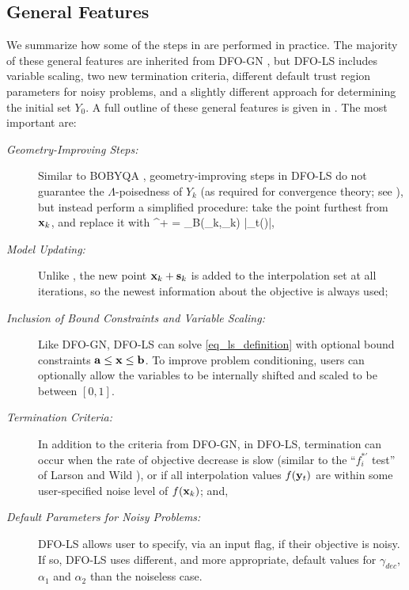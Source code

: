 \subsection{General Features} \label{sec_implementation_general}
We summarize how some of the steps in  are performed in practice. 
The majority of these general features are inherited from DFO-GN \cite{Cartis2017a}, but DFO-LS includes variable scaling, two new termination criteria, different default trust region parameters for noisy problems, and a slightly different approach for determining the initial set $Y_0$.
A full outline of these general features is given in .
The most important are:

\begin{description}
	\item[\normalfont\textit{Geometry-Improving Steps:}] Similar to BOBYQA \cite{Powell2009}, geometry-improving steps in DFO-LS do not guarantee the $\Lambda$-poisedness of $Y_k$ (as required for convergence theory; see ), but instead perform a simplified procedure: take the point furthest from $\mathbf{x}_k$, and replace it with
	\be \by^+ = \argmax_{\by\in B(\bx_k,\Delta_k)} |\Lambda_t(\by)|, \label{eq_geom_improvement} \ee
	\item[\normalfont\textit{Model Updating:}] Unlike , the new point $\mathbf{x}_k+\mathbf{s}_k$ is added to the interpolation set at all iterations, so the newest information about the objective is always used;
	\item[\normalfont\textit{Inclusion of Bound Constraints and Variable Scaling:}] Like DFO-GN, DFO-LS can solve \eqref{eq_ls_definition} with optional bound constraints $\mathbf{a} \leq \mathbf{x} \leq \mathbf{b}$. To improve problem conditioning, users can optionally allow the variables to be internally shifted and scaled to be between $[0,1]$.
	\item[\normalfont\textit{Termination Criteria:}] In addition to the criteria from DFO-GN, in DFO-LS, termination can occur when the rate of objective decrease is slow (similar to the ``$f_i^{*\prime}$ test'' of Larson and Wild \cite{Larson2013}), or if all interpolation values $f(\mathbf{y}_t)$ are within some user-specified noise level of $f(\mathbf{x}_k)$; and,
	\item[\normalfont\textit{Default Parameters for Noisy Problems:}] DFO-LS allows user to specify, via an input flag, if their objective is noisy. If so, DFO-LS uses different, and more appropriate, default values for $\gamma_{dec}$, $\alpha_1$ and $\alpha_2$ than the noiseless case.
\end{description}

